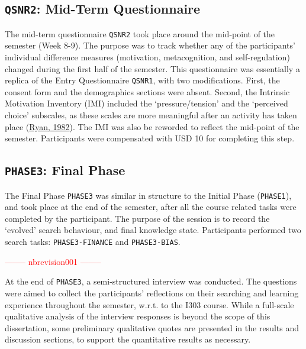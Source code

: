 \documentclass[letterpaper, nobind]{templates/ociamthesis}
\begin{document}
\hypertarget{sec-method-qsnr2}{%
\subsection{\texorpdfstring{\texttt{QSNR2}: Mid-Term Questionnaire}{QSNR2: Mid-Term Questionnaire}}\label{sec-method-qsnr2}}

The mid-term questionnaire \texttt{QSNR2} took place around the mid-point of the semester (Week 8-9).
The purpose was to track whether any of the participants' individual difference measures (motivation, metacognition, and self-regulation) changed during the first half of the semester.
This questionnaire was essentially a replica of the Entry Questionnaire \texttt{QSNR1}, with two modifications. First, the consent form and the demographics sections were absent.
Second, the Intrinsic Motivation Inventory (IMI) included the `pressure/tension' and the `perceived choice' subscales, as these scales are more meaningful after an activity has taken place (\protect\hyperlink{ref-ryan1982control}{Ryan, 1982}).
The IMI was also be reworded to reflect the mid-point of the semester.
Participants were compensated with USD 10 for completing this step.

\hypertarget{sec-method-phase3}{%
\subsection{\texorpdfstring{\texttt{PHASE3}: Final Phase}{PHASE3: Final Phase}}\label{sec-method-phase3}}

The Final Phase \texttt{PHASE3} was similar in structure to the Initial Phase (\texttt{PHASE1}), and took place at the end of the semester, after all the course related tasks were completed by the participant. The purpose of the session is to record the `evolved' search behaviour, and final knowledge state.
Participants performed two search tasks: \texttt{PHASE3-FINANCE} and \texttt{PHASE3-BIAS}.

\textcolor{red}{-------- nbrevision001 --------}

At the end of \texttt{PHASE3}, a semi-structured interview was conducted.
The questions were aimed to collect the participants' reflections on their searching and learning experience throughout the semester, w.r.t. to the I303 course.
While a full-scale qualitative analysis of the interview responses is beyond the scope of this dissertation, some preliminary qualitative quotes are presented in the results and discussion sections, to support the quantitative results as necessary.
\end{document}
